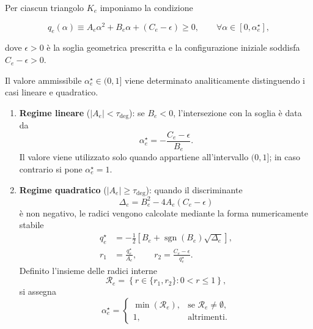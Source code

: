 Per ciascun triangolo $K_e$ imponiamo la condizione

\begin{equation}
q_e(\alpha)
\equiv
A_e\alpha^2
+
B_e\alpha
+
(C_e-\epsilon)
\geq 0,
\qquad
\forall\alpha\in[0,\alpha_e^\star],
\label{eq:safety_polynomial}
\end{equation}

dove $\epsilon>0$ è la soglia geometrica prescritta e la configurazione iniziale soddisfa $C_e-\epsilon>0$.

Il valore ammissibile $\alpha_e^\star\in(0,1]$ viene determinato analiticamente distinguendo i casi lineare e quadratico.

\begin{enumerate}
    \item \textbf{Regime lineare} ($|A_e|<\tau_{\mathrm{deg}}$): se
    $B_e<0$, l'intersezione con la soglia è data da
    \[
    \alpha_e^\star
    =
    -\frac{C_e-\epsilon}{B_e}.
    \]
    Il valore viene utilizzato solo quando appartiene all'intervallo $(0,1]$; in caso contrario si pone $\alpha_e^\star=1$.

    \item \textbf{Regime quadratico} ($|A_e|\geq\tau_{\mathrm{deg}}$):
    quando il discriminante
    \[
    \Delta_e
    =
    B_e^2-4A_e(C_e-\epsilon)
    \]
    è non negativo, le radici vengono calcolate mediante la forma numericamente stabile
    \begin{equation}
    \begin{aligned}
        q_e^\star
        &=
        -\frac{1}{2}
        \left[
        B_e+\operatorname{sgn}(B_e)\sqrt{\Delta_e}
        \right],
        \\
        r_1
        &=
        \frac{q_e^\star}{A_e},
        \qquad
        r_2
        =
        \frac{C_e-\epsilon}{q_e^\star}.
    \end{aligned}
    \label{eq:stable_roots}
    \end{equation}
    Definito l'insieme delle radici interne
    \[
    \mathcal{R}_e
    =
    \left\{
    r\in\{r_1,r_2\}:0<r\leq1
    \right\},
    \]
    si assegna
    \begin{equation}
    \alpha_e^\star
    =
    \begin{cases}
    \min(\mathcal{R}_e),
    & \text{se } \mathcal{R}_e\neq\emptyset,
    \\
    1,
    & \text{altrimenti}.
    \end{cases}
    \label{eq:element_safe_alpha}
    \end{equation}
\end{enumerate}

